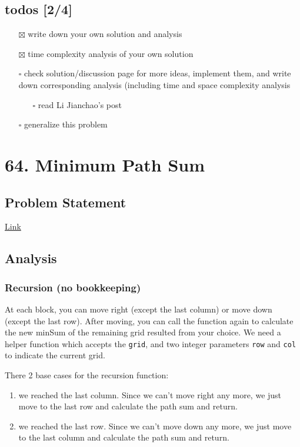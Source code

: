 \documentclass[12pt]{article}
\begin{document}
\subsection{todos [2/4]}
\label{sec:org6acc560}
\begin{itemize}
\item[{$\boxtimes$}] write down your own solution and analysis
\item[{$\boxtimes$}] time complexity analysis of your own solution
\item[{$\square$}] check solution/discussion page for more ideas, implement them, and write down corresponding analysis (including time and space complexity analysis
\begin{itemize}
\item[{$\square$}] read Li Jianchao's post
\end{itemize}

\item[{$\square$}] generalize this problem
\end{itemize}
\section{64. Minimum Path Sum}
\label{sec:orgac95a13}
\subsection{Problem Statement}
\label{sec:org68fada9}
\href{https://leetcode.com/problems/minimum-path-sum/}{Link}
\subsection{Analysis}
\label{sec:orgcfde462}
\subsubsection{Recursion (no bookkeeping)}
\label{sec:orga9133b3}
At each block, you can move right (except the last column) or move down (except the last row). After moving, you can call the function again to calculate the new minSum of the remaining grid resulted from your choice. We need a helper function which accepts the \texttt{grid}, and two integer parameters \texttt{row} and \texttt{col} to indicate the current grid.

There 2 base cases for the recursion function:
\begin{enumerate}
\item we reached the last column. Since we can't move right any more, we just move to the last row and calculate the path sum and return.
\item we reached the last row. Since we can't move down any more, we just move to the last column and calculate the path sum and return.
\end{enumerate}
\end{document}
